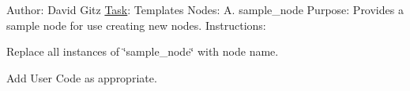 Author\+: David Gitz \hyperlink{structTask}{Task}\+: Templates Nodes\+: A. sample\+\_\+node Purpose\+: Provides a sample node for use creating new nodes. Instructions\+:
\begin{DoxyEnumerate}
\item Replace all instances of \char`\"{}sample\+\_\+node\char`\"{} with node name.
\item Add User Code as appropriate. 
\end{DoxyEnumerate}